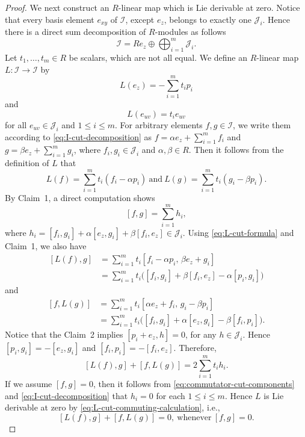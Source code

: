 \documentclass[reqno]{amsart}
\numberwithin{equation}{section}
\theoremstyle{plain}
\theoremstyle{definition}
\newcommand{\I}{\mathcal I}
\begin{document}
\begin{proof}
\smallskip
We next construct an $R$-linear map which is Lie derivable at zero.
Notice that every basis element $e_{xy}$ of $\I$, except $e_z$, belongs to exactly one $\mathcal{J}_i$.
Hence there is a direct sum decomposition of $R$-modules as follows
\begin{equation}\label{eq:I-cut-decomposition}
\I=Re_z\oplus\bigoplus_{i=1}^m\mathcal J_i.
\end{equation}
Let $t_1,\ldots,t_m\in R$ be scalars, which are not all equal. We define an $R$-linear map $L:\I\to\I$ by
\[
L(e_z)=-\sum_{i=1}^m t_ip_i
\]
and
\[
L(e_{uv})=t_i e_{uv}
\]
for all $e_{uv}\in \mathcal{J}_i$ and $1\leq i\leq m$. For arbitrary elements $f,g\in \I$,
we write them according to \eqref{eq:I-cut-decomposition} as
$f=\alpha e_z+\sum_{i=1}^m f_i$ and $g=\beta e_z+\sum_{i=1}^m g_i$, where
$f_i,g_i\in\mathcal J_i$ and $\alpha,\beta\in R$.
Then it follows from the definition of $L$ that
\begin{equation}\label{eq:L-cut-formula}
L(f)=\sum_{i=1}^m t_i(f_i-\alpha p_i)~\text{and}~
L(g)=\sum_{i=1}^m t_i(g_i-\beta p_i).
\end{equation}
By Claim~1, a direct computation shows
\begin{equation}\label{eq:commutator-cut-components}
[f,g]=\sum_{i=1}^m h_i,
\end{equation}
where
$h_i=[f_i,g_i]+\alpha[e_z,g_i]+\beta[f_i,e_z]\in\mathcal J_i$.
Using \eqref{eq:L-cut-formula} and Claim~1, we also have
\[
\begin{aligned}
{}[L(f),g]
&=\sum_{i=1}^m t_i
[f_i-\alpha p_i,\,\beta e_z+g_i]\\
&=\sum_{i=1}^m t_i
\bigl([f_i,g_i]+\beta[f_i,e_z]-\alpha[p_i,g_i]\bigr)
\end{aligned}
\]
and
\[
\begin{aligned}
{}[f,L(g)]
&=\sum_{i=1}^m t_i
[\alpha e_z+f_i,\,g_i-\beta p_i]\\
&=\sum_{i=1}^m t_i
\bigl([f_i,g_i]+\alpha[e_z,g_i]-\beta[f_i,p_i]\bigr).
\end{aligned}
\]
Notice that the Claim~2 implies $[p_i+e_z,h]=0$, for any $h\in\mathcal J_i$. Hence
$[p_i,g_i]=-[e_z,g_i]$ and $[f_i,p_i]=-[f_i,e_z]$. Therefore,
\begin{equation}\label{eq:L-cut-commuting-calculation}
[L(f),g]+[f,L(g)]=2\sum_{i=1}^m t_i h_i.
\end{equation}
If we assume $[f,g]=0$, then it follows from \eqref{eq:commutator-cut-components} and \eqref{eq:I-cut-decomposition}
that $h_i=0$ for each $1\leq i\leq m$. Hence $L$ is Lie derivable at zero by \eqref{eq:L-cut-commuting-calculation}, i.e.,
\begin{equation}\label{eq:counterexample-commuting}
[L(f),g]+[f,L(g)]=0,~\text{whenever}~[f,g]=0.
\end{equation}


\end{proof}
\end{document}
